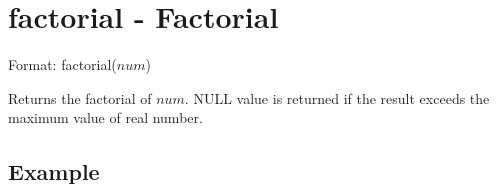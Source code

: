 
%

\section{factorial - Factorial\label{sect:factorial}}

Format: factorial($num$)

Returns the factorial of $num$.
NULL value is returned if the result exceeds the maximum value of real number. 

\subsection*{Example}


%
